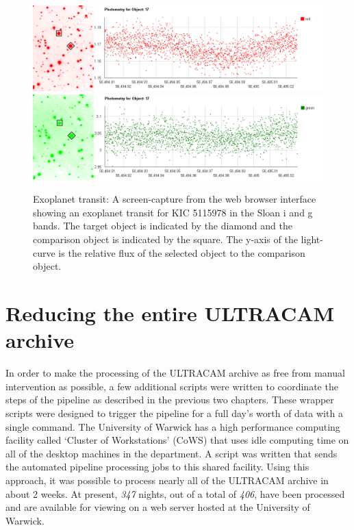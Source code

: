 \begin{figure}
\centering
\includegraphics[width=150mm]{images/koi823-r-lc.png}
\includegraphics[width=150mm]{images/koi823-g-lc.png}
\caption{Exoplanet transit: A screen-capture from the web browser interface showing an exoplanet transit for KIC 5115978 in the Sloan i and g bands. The target object is indicated by the diamond and the comparison object is indicated by the square. The y-axis of the light-curve is the relative flux of the selected object to the comparison object.}
\label{fig:gumus-discovery}
\end{figure}


\section{Reducing the entire ULTRACAM archive}
In order to make the processing of the ULTRACAM archive as free from manual intervention as possible, a few additional scripts were written to coordinate the steps of the pipeline as described in the previous two chapters. These wrapper scripts were designed to trigger the pipeline for a full day's worth of data with a single command. The University of Warwick has a high performance computing facility called `Cluster of Workstations' (CoWS) that uses idle computing time on all of the desktop machines in the department. A script was written that sends the automated pipeline processing jobs to this shared facility. Using this approach, it was possible to process nearly all of the ULTRACAM archive in about 2 weeks. At present, \emph{347} nights, out of a total of \emph{406}, have been processed and are available for viewing on a web server hosted at the University of Warwick. 

